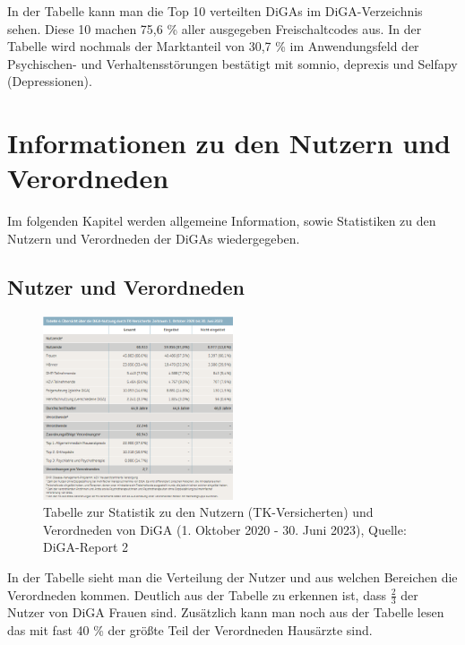 \documentclass{article}
\begin{document}
			In der Tabelle kann man die Top 10 verteilten DiGAs im DiGA-Verzeichnis sehen. Diese 10 machen 75,6 \% aller ausgegeben Freischaltcodes aus. In der Tabelle wird nochmals der Marktanteil von 30,7 \% im Anwendungsfeld der Psychischen- und Verhaltensstörungen bestätigt mit somnio, deprexis und Selfapy (Depressionen).  
	
	\section{Informationen zu den Nutzern und Verordneden}
		Im folgenden Kapitel werden allgemeine Information, sowie Statistiken zu den Nutzern und Verordneden der DiGAs wiedergegeben.
		\subsection{Nutzer und Verordneden}
			\begin{figure}[htbp]
				\centering
				\includegraphics[width=0.5\textwidth]{./grafiken/tabelle_nutzung_versicherte_diga}
				\caption[Statistik zu den Nutzern (TK-Versicherten) und Verordneden von DiGA]{Tabelle zur Statistik zu den Nutzern (TK-Versicherten) und Verordneden von DiGA (1. Oktober 2020 - 30. Juni 2023), Quelle: DiGA-Report 2 \cite{TK-Report-2}}
				\label{Tab-nutzung-versicherte-diga}
			\end{figure}
			In der Tabelle sieht man die Verteilung der Nutzer und aus welchen Bereichen die Verordneden kommen. Deutlich aus der Tabelle zu erkennen ist, dass $\frac{2}{3}$ der Nutzer von DiGA Frauen sind. Zusätzlich kann man noch aus der Tabelle lesen das mit fast 40 \% der größte Teil der Verordneden Hausärzte sind.\par
			
\end{document}
